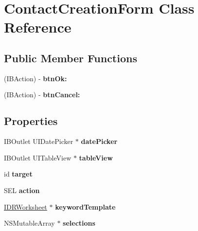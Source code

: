 \hypertarget{interface_contact_creation_form}{
\section{ContactCreationForm Class Reference}
\label{interface_contact_creation_form}
}
\subsection*{Public Member Functions}
\begin{DoxyCompactItemize}
\item 
\hypertarget{interface_contact_creation_form_ae0f939057ae80e7ef51188b6d685ad92}{
(IBAction) -\/ {\bfseries btnOk:}}
\label{interface_contact_creation_form_ae0f939057ae80e7ef51188b6d685ad92}

\item 
\hypertarget{interface_contact_creation_form_aa44105c3e3c52d95f05d1e5407e2f27b}{
(IBAction) -\/ {\bfseries btnCancel:}}
\label{interface_contact_creation_form_aa44105c3e3c52d95f05d1e5407e2f27b}

\end{DoxyCompactItemize}
\subsection*{Properties}
\begin{DoxyCompactItemize}
\item 
\hypertarget{interface_contact_creation_form_a44e1ebdc1c6f7bf985464da382cf716a}{
IBOutlet UIDatePicker $\ast$ {\bfseries datePicker}}
\label{interface_contact_creation_form_a44e1ebdc1c6f7bf985464da382cf716a}

\item 
\hypertarget{interface_contact_creation_form_aec71d021a6d16fc9f40937b92eb0a95e}{
IBOutlet UITableView $\ast$ {\bfseries tableView}}
\label{interface_contact_creation_form_aec71d021a6d16fc9f40937b92eb0a95e}

\item 
\hypertarget{interface_contact_creation_form_a05c87ba7697f2cc581c4e05d791d047c}{
id {\bfseries target}}
\label{interface_contact_creation_form_a05c87ba7697f2cc581c4e05d791d047c}

\item 
\hypertarget{interface_contact_creation_form_a471dd1af06020ad49fb2c7a987858c83}{
SEL {\bfseries action}}
\label{interface_contact_creation_form_a471dd1af06020ad49fb2c7a987858c83}

\item 
\hypertarget{interface_contact_creation_form_aa8e6164ffa0daad122386b958387cf36}{
\hyperlink{interface_i_d_r_worksheet}{IDRWorksheet} $\ast$ {\bfseries keywordTemplate}}
\label{interface_contact_creation_form_aa8e6164ffa0daad122386b958387cf36}

\item 
\hypertarget{interface_contact_creation_form_a13309fa6b61e4cdd16f1f74fc82c4e1f}{
NSMutableArray $\ast$ {\bfseries selections}}
\label{interface_contact_creation_form_a13309fa6b61e4cdd16f1f74fc82c4e1f}

\end{DoxyCompactItemize}



